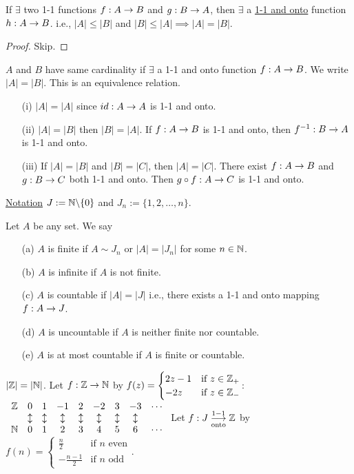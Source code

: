 \documentclass[]{article}
\begin{document}
\begin{theorem}
	If $\exists$ two 1-1 functions $f:A\rightarrow B$ and $g:B\rightarrow A$, then $\exists$ a \ul{1-1 and onto} function $h:A\rightarrow B$.
	i.e., $|A|\leq |B|$ and $|B|\leq |A| \implies |A|=|B|$.
\end{theorem}
\begin{proof}
	Skip.
\end{proof}
\begin{definition}
	$A$ and $B$ have same cardinality if $\exists$ a 1-1 and onto function $f:A\rightarrow B$. We write $|A| = |B|$. This is an equivalence relation.
	\begin{enumerate}
		\item[(i)] $|A| = |A|$ since $id:A\rightarrow A$ is 1-1 and onto.
		\item[(ii)] $|A|=|B|$ then $|B|=|A|$. If $f:A\rightarrow B$ is 1-1 and onto, then $f^{-1}:B\rightarrow A$ is 1-1 and onto.
		\item[(iii)] If $|A|=|B|$ and $|B|=|C|$, then $|A|=|C|$. There exist $f:A\rightarrow B$ and $g:B\rightarrow C$ both 1-1 and onto. Then $g\circ f: A\rightarrow C$ is 1-1 and onto.
	\end{enumerate}
\end{definition}

\ul{Notation} $J:= \mathbb{N}\backslash \{0\}$ and $J_n := \{1,2,\dots,n\}$.
\begin{definition}
	Let $A$ be any set. We say
	\begin{enumerate}
		\item[(a)] $A$ is finite if $A\sim J_n$ or $|A|=|J_n|$ for some $n\in\mathbb{N}$.
		\item[(b)] $A$ is infinite if $A$ is not finite.
		\item[(c)] $A$ is countable if $|A| = |J|$ i.e., there exists a 1-1 and onto mapping $f:A\rightarrow J$.
		\item[(d)] $A$ is uncountable if $A$ is neither finite nor countable.
		\item[(e)] $A$ is at most countable if $A$ is finite or countable.
	\end{enumerate}
\end{definition}
\begin{example}
$|\mathbb{Z}| = |\mathbb{N}|$. Let $f:\mathbb{Z}\rightarrow\mathbb{N}$ by $f(z) = \begin{cases} 2z-1 & \text{if } z\in\mathbb{Z}_+ \\ -2z & \text{if } z\in\mathbb{Z}_- \end{cases}$:
	$\begin{array}{ccccccccc}
			\mathbb{Z} & 0 & 1 & -1 & 2 & -2 & 3 & -3 & \cdots \\
			\, & \updownarrow & \updownarrow & \updownarrow & \updownarrow & \updownarrow & \updownarrow & \updownarrow  & \, \\
			\mathbb{N} & 0 & 1 & 2 & 3 & 4 & 5 & 6 & \cdots
	\end{array}$
Let $f:J \overset{1-1}{\underset{\text{onto}}{\longrightarrow}} \mathbb{Z}$ by $f(n) = \begin{cases} \frac{n}{2} & \text{if } n \text{ even}\\ -\frac{n-1}{2} & \text{if } n \text{ odd} \end{cases}$.
\end{example}
\end{document}

